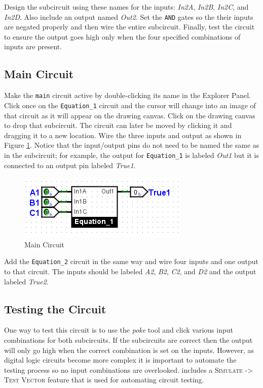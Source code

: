Design the subcircuit using these names for the inputs: \textit{In2A}, \textit{In2B}, \textit{In2C}, and \textit{In2D}. Also include an output named \textit{Out2}. Set the \texttt{AND} gates so the their inputs are negated properly and then wire the entire subcircuit. Finally, test the circuit to ensure the output goes high only when the four specified combinations of inputs are present.

\subsection{Main Circuit}

Make the \lstinline[columns=fixed]|main| circuit active by double-clicking its name in the Explorer Panel. Click once on the \lstinline[columns=fixed]|Equation_1| circuit and the cursor will change into an image of that circuit as it will appear on the drawing canvas. Click on the drawing canvas to drop that subcircuit. The circuit can later be moved by clicking it and dragging it to a new location. Wire the three inputs and output as shown in Figure \ref{fig:02-05}. Notice that the input/output pins do not need to be named the same as in the subcircuit; for example, the output for \lstinline[columns=fixed]|Equation_1| is labeled \textit{Out1} but it is connected to an output pin labeled \textit{True1}.

\begin{figure}[H]
	\centering
	\includegraphics[width=\maxwidth{.95\linewidth}]{gfx/02-05}
	\caption{Main Circuit}
	\label{fig:02-05}
\end{figure}

Add the \lstinline[columns=fixed]|Equation_2| circuit in the same way and wire four inputs and one output to that circuit. The inputs should be labeled \textit{A2}, \textit{B2}, \textit{C2}, and \textit{D2} and the output labeled \textit{True2}.

\subsection{Testing the Circuit}

One way to test this circuit is to use the \textit{poke} tool and click various input combinations for both subcircuits. If the subcircuits are correct then the output will only go high when the correct combination is set on the inputs. However, as digital logic circuits become more complex it is important to automate the testing process so no input combinations are overlooked. \LE includes a \textsc{Simulate -> Test Vector} feature that is used for automating circuit testing.

